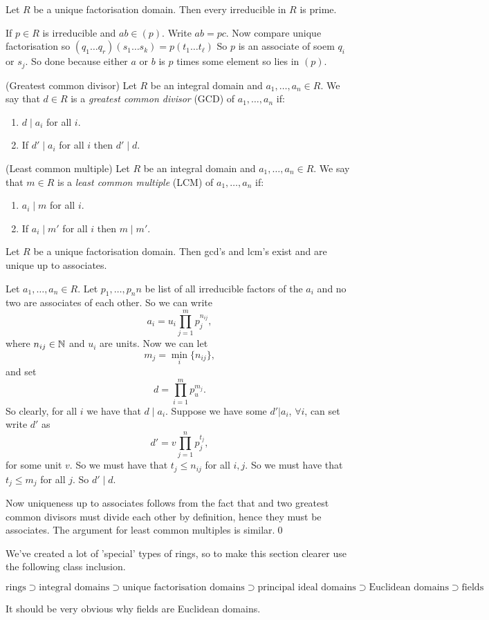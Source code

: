 \documentclass{article}
\begin{document}
\begin{claim}
  Let $ R $ be a unique factorisation domain. Then every irreducible in $ R $ is prime.
\end{claim}
If $ p\in R $ is irreducible and $ ab\in (p) $. Write $ ab=pc $. Now compare unique factorisation so $ (q_1\dots q_r)(s_1\dots s_k)=p(t_1\dots t_\ell) $ So $ p $ is an associate of soem $ q_i $ or $ s_j $. So done because either $ a $ or $ b $ is $ p $ times some element so lies in $ (p) $.
\begin{definition}
	(Greatest common divisor) Let $ R $ be an integral domain and $ a_1,\dots, a_n\in R $. We say that $ d\in  R $ is a \textit{greatest common divisor} (GCD) of $ a_1, \dots, a_n $ if:
        \begin{enumerate}
 	         \item $ d\mid a_i $ for all $ i $.
	         \item If $ d'\mid a_i $ for all $ i $ then $ d'\mid d $.
        \end{enumerate}
\end{definition}
\begin{definition}
	(Least common multiple) Let $ R $ be an integral domain and $ a_1,\dots, a_n\in R $. We say that $ m\in R $ is a \textit{least common multiple} (LCM) of $ a_1,\dots, a_n $ if:
	\begin{enumerate}
		\item $ a_i\mid m $ for all $ i $.
		\item If $ a_i\mid m' $ for all $ i $ then $ m\mid m' $.
	\end{enumerate}	
\end{definition}
\begin{theorem}
  Let $ R $ be a unique factorisation domain. Then gcd's and lcm's exist and are unique up to associates.
\end{theorem}
\pf Let $ a_1,\dots,a_n\in R $. Let $ p_1,\dots,p_nn $ be list of all irreducible factors of the $ a_i $ and no two are associates of each other. So we can write
\[
	a_i=u_i\prod_{j=1}^mp_j^{n_{ij}},
\]
where $ n_{ij}\in \mathbb{N} $ and $ u_i $ are units. Now we can let
\[
	m_j=\min_i\{n_{ij}\},
\]
and set
\[
	d=\prod_{i=1}^mp_u^{m_j}.
\]
So clearly, for all $ i $ we have that $ d\mid a_i $. Suppose we have some $ d'|a_i $, $ \forall i $, can set write $ d' $ as
\[
	d'=v\prod_{j=1}^np_j^{t_j},
\]
for some unit $ v $. So we must have that $ t_j\le n_{ij} $ for all $ i,j $. So we must have that $ t_j\le m_j $ for all $ j $. So $ d'\mid d $.\par
Now uniqueness up to associates follows from the fact that and two greatest common divisors must divide each other by definition, hence they must be associates. The argument for least common multiples is similar.\qed
\par We've created a lot of 'special' types of rings, so to make this section clearer use the following class inclusion.\par
$
	\text{rings} \supset \text{integral domains}\supset\text{unique factorisation domains} \supset \text{principal ideal domains}\supset \text{Euclidean domains} \supset \text{fields}
$\par
It should be very obvious why fields are Euclidean domains.
\end{document}
